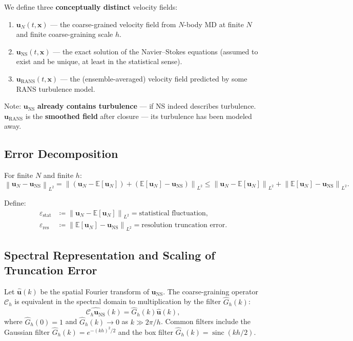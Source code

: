 \documentclass[11pt,a4paper]{article}
\theoremstyle{definition}
\theoremstyle{remark}
\newcommand{\E}{\mathbb{E}}
\newcommand{\norm}[1]{\left\lVert#1\right\rVert}
\newcommand{\uN}{\bm{u}_N}
\newcommand{\uNS}{\bm{u}_{\text{NS}}}
\newcommand{\uRANS}{\bm{u}_{\text{RANS}}}
\newcommand{\epsRes}{\varepsilon_{\text{res}}}
\newcommand{\epsStat}{\varepsilon_{\text{stat}}}
\begin{document}
We define three \textbf{conceptually distinct} velocity fields:

\begin{enumerate}[label=(\arabic*),leftmargin=*]
  \item $\uN(t,\bm{x})$ --- the coarse-grained velocity field from $N$-body MD at finite $N$ and finite coarse-graining scale $h$.
  \item $\uNS(t,\bm{x})$ --- the exact solution of the Navier--Stokes equations (assumed to exist and be unique, at least in the statistical sense).
  \item $\uRANS(t,\bm{x})$ --- the (ensemble-averaged) velocity field predicted by some RANS turbulence model.
\end{enumerate}

Note: $\uNS$ \textbf{already contains turbulence} --- if NS indeed describes turbulence. $\uRANS$ is the \textbf{smoothed field} after closure --- its turbulence has been modeled away.

\subsection{Error Decomposition}

For finite $N$ and finite $h$:
\begin{equation}\label{eq:error_decomp}
  \norm{\uN - \uNS}_{L^2}
  = \norm{(\uN - \E[\uN]) + (\E[\uN] - \uNS)}_{L^2}
  \leq \norm{\uN - \E[\uN]}_{L^2} + \norm{\E[\uN] - \uNS}_{L^2}.
\end{equation}

Define:
\begin{align}
  \epsStat &\coloneqq \norm{\uN - \E[\uN]}_{L^2}
            = \text{statistical fluctuation}, \label{eq:eps_stat}\\
  \epsRes  &\coloneqq \norm{\E[\uN] - \uNS}_{L^2}
            = \text{resolution truncation error}. \label{eq:eps_res}
\end{align}

\subsection{Spectral Representation and Scaling of Truncation Error}

Let $\hat{\bm{u}}(k)$ be the spatial Fourier transform of $\uNS$. The coarse-graining operator $\mathcal{C}_h$ is equivalent in the spectral domain to multiplication by the filter $\hat{G}_h(k)$:
\begin{equation}\label{eq:filter_k}
  \widehat{\mathcal{C}_h \uNS}(k) = \hat{G}_h(k) \hat{\bm{u}}(k),
\end{equation}
where $\hat{G}_h(0)=1$ and $\hat{G}_h(k) \to 0$ as $k \gg 2\pi/h$. Common filters include the Gaussian filter $\hat{G}_h(k) = e^{-(kh)^2/2}$ and the box filter $\hat{G}_h(k) = \operatorname{sinc}(kh/2)$.
\end{document}

